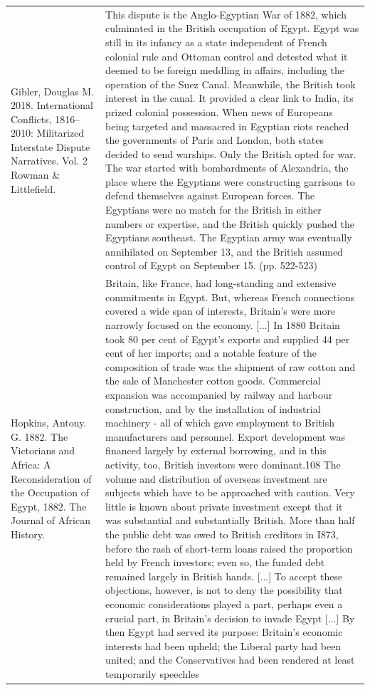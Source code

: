 {\begin{longtable}{p{}p{}}
Gibler, Douglas M. 2018. International Conflicts, 1816–2010: Militarized Interstate Dispute Narratives. Vol. 2 Rowman \& Littlefield. & This dispute is the Anglo-Egyptian War of 1882, which culminated in the British occupation of Egypt. Egypt was still in its infancy as a state independent of French colonial rule and Ottoman control and detested what it deemed to be foreign meddling in affairs, including the operation of the Suez Canal. Meanwhile, the British took interest in the canal. It provided a clear link to India, its prized colonial possession. When news of Europeans being targeted and massacred in Egyptian riots reached the governments of Paris and London, both states decided to send warships. Only the British opted for war. The war started with bombardments of Alexandria, the place where the Egyptians were constructing garrisons to defend themselves against European forces. The Egyptians were no match for the British in either numbers or expertise, and the British quickly pushed the Egyptians southeast. The Egyptian army was eventually annihilated on September 13, and the British assumed control of Egypt on September 15. (pp. 522-523)
\\
Hopkins, Antony. G. 1882. The Victorians and Africa: A Reconsideration of the Occupation of Egypt, 1882. The Journal of African History. & Britain, like France, had long-standing and extensive commitments in Egypt. But, whereas French connections covered a wide span of interests, Britain's were more narrowly focused on the economy. [...] In 1880 Britain took 80 per cent of Egypt's exports and supplied 44 per cent of her imports; and a notable feature of the composition of trade was the shipment of raw cotton and the sale of Manchester cotton goods. Commercial expansion was accompanied by railway and harbour construction, and by the installation of industrial machinery - all of which gave employment to British manufacturers and personnel. Export development was financed largely by external borrowing, and in this activity, too, British investors were dominant.108 The volume and distribution of overseas investment are subjects which have to be approached with caution. Very little is known about private investment except that it was substantial and substantially British. More than half the public debt was owed to British creditors in I873, before the rash of short-term loans raised the proportion held by French investors; even so, the funded debt remained largely in British hands. [...] To accept these objections, however, is not to deny the possibility that economic considerations played a part, perhaps even a crucial part, in Britain's decision to invade Egypt [...] By then Egypt had served its purpose: Britain's economic interests had been upheld; the Liberal party had been united; and the Conservatives had been rendered at least temporarily speechles

\end{longtable}}
